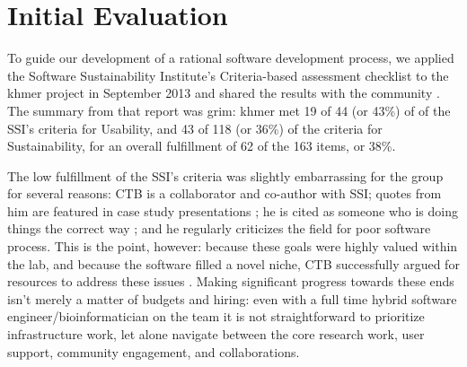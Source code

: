\documentclass[11pt]{article}
\begin{document}

\section{Initial Evaluation}

To guide our development of a rational software development process,
we applied the Software Sustainability Institute's Criteria-based
assessment checklist \cite{SSI-eval-guide} to the khmer project in
September 2013 and shared the results with the community
\cite{khmer-assessment}. The summary from that report was grim: khmer
met 19 of 44 (or 43\%) of of the SSI's criteria for Usability, and 43
of 118 (or 36\%) of the criteria for Sustainability, for an overall
fulfillment of 62 of the 163 items, or 38\%.


The low fulfillment of the SSI's criteria was slightly embarrassing for
the group for several reasons: CTB is a collaborator and co-author
with SSI; quotes from him are featured in case study presentations
\cite{SSI-casestudies}; he is cited as someone who is doing things the
correct way \cite{SSI-recomputation}; and he regularly criticizes the
field for poor software process.  This is the point, however: because
these goals were highly valued within the lab, and because the
software filled a novel niche, CTB successfully argued for resources
to address these issues \cite{khmer-future}.  Making significant
progress towards these ends isn't merely a matter of budgets and
hiring: even with a full time hybrid software
engineer/bioinformatician on the team it is not straightforward to
prioritize infrastructure work, let alone navigate between the core
research work, user support, community engagement, and collaborations.
\end{document}
